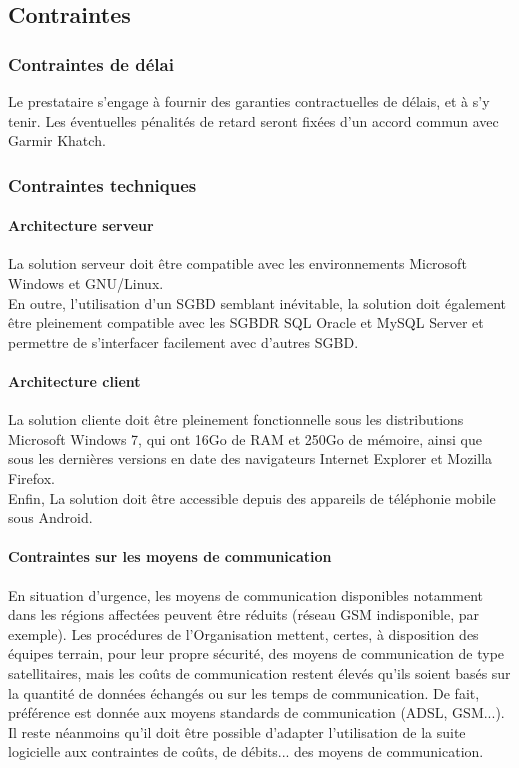 \documentclass[11pt,fleqn]{book} %
\begin{document}
\subsection{Contraintes}

\subsubsection{Contraintes de délai}
Le prestataire s'engage à fournir des garanties contractuelles de délais, et à s'y tenir. Les éventuelles pénalités de retard seront fixées d'un accord commun avec Garmir Khatch.

\subsubsection{Contraintes techniques}

\paragraph{Architecture serveur}
La solution serveur doit être compatible avec les environnements Microsoft Windows et GNU/Linux.
\\
En outre, l'utilisation d'un SGBD semblant inévitable, la solution doit également être pleinement compatible avec les SGBDR SQL Oracle et MySQL Server et permettre de s'interfacer facilement avec d'autres SGBD.

\paragraph{Architecture client}
La solution cliente doit être pleinement fonctionnelle sous les distributions Microsoft Windows 7, qui ont 16Go de RAM et 250Go de mémoire, ainsi que sous les dernières versions en date des navigateurs Internet Explorer et Mozilla Firefox.
\\
Enfin, La solution doit être accessible depuis des appareils de téléphonie mobile sous Android.

\paragraph{Contraintes sur les moyens de communication}
En situation d'urgence, les moyens de communication disponibles notamment dans les régions affectées peuvent être \og{}réduits\fg{} (réseau GSM indisponible, par exemple). Les procédures de l'Organisation mettent, certes, à disposition des équipes terrain, pour leur propre sécurité, des moyens de communication de type satellitaires, mais les coûts de communication restent élevés qu'ils soient basés sur la quantité de données échangés ou sur les temps de communication. De fait, préférence est donnée aux moyens \og{}standards\fg{} de communication (ADSL, GSM...). Il reste néanmoins qu'il doit être possible d'adapter l'utilisation de la suite logicielle aux contraintes de coûts, de débits... des moyens de communication.
\end{document}
